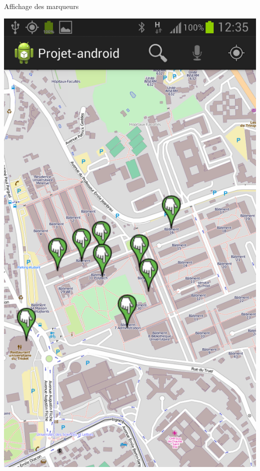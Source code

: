 \documentclass{beamer}
\begin{document}
		\begin{frame}
			Affichage des marqueurs
			\begin{center}
				\includegraphics[scale=0.15]{../rapport/marqueurs.png}
			\end{center}
		\end{frame}
		
\end{document}
